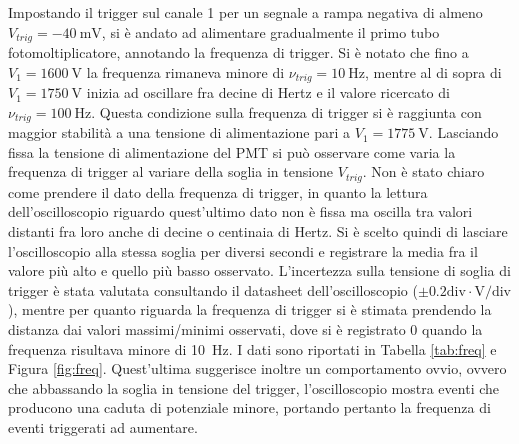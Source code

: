 \documentclass[10pt,a4paper]{article}
\begin{document}
Impostando il trigger sul canale 1 per un segnale a rampa negativa di almeno $V_{trig}=\SI{-40}{\milli \volt}$, si è andato ad alimentare gradualmente il primo tubo fotomoltiplicatore, annotando la frequenza di trigger. Si è notato che fino a $V_1=\SI{1600}{\volt}$ la frequenza rimaneva minore di  $\nu_{trig}=\SI{10}{\hertz}$, mentre al di sopra di $V_1=\SI{1750}{\volt}$ inizia ad oscillare fra decine di Hertz e il valore ricercato di $\nu_{trig}=\SI{100}{\hertz}$. Questa condizione sulla frequenza di trigger si è raggiunta con maggior stabilità a una tensione di alimentazione pari a $V_1=\SI{1775}{\volt}$. 
    Lasciando fissa la tensione di alimentazione del PMT si può osservare come varia la frequenza di trigger al variare della soglia in tensione $V_{trig}$. Non è stato chiaro come prendere il dato della frequenza di trigger, in quanto la lettura dell'oscilloscopio riguardo quest'ultimo dato non è fissa ma oscilla tra valori distanti fra loro anche di decine o centinaia di Hertz. Si è scelto quindi di lasciare l'oscilloscopio alla stessa soglia per diversi secondi e registrare la media fra il valore più alto e quello più basso osservato. L'incertezza sulla tensione di soglia di trigger è stata valutata consultando il datasheet dell'oscilloscopio ($\pm0.2 \text{div} \cdot \text{V}/\text{div}$), mentre per quanto riguarda la frequenza di trigger si è stimata prendendo la distanza dai valori massimi/minimi osservati, dove si è registrato 0 quando la frequenza risultava minore di \SI{10}{\hertz}. I dati sono riportati in Tabella \ref{tab:freq} e Figura \ref{fig:freq}. Quest'ultima suggerisce inoltre un comportamento ovvio, ovvero che abbassando la soglia in tensione del trigger, l'oscilloscopio mostra eventi che producono una caduta di potenziale minore, portando pertanto la frequenza di eventi triggerati ad aumentare.
\end{document}
